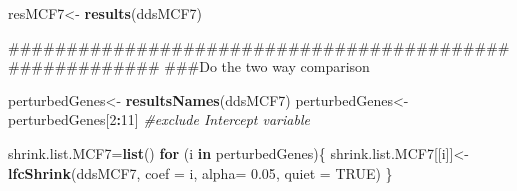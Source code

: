 \documentclass[]{article}
\newenvironment{Shaded}{\begin{snugshade}}{\end{snugshade}}
\newcommand{\KeywordTok}[1]{\textcolor[rgb]{0.13,0.29,0.53}{\textbf{#1}}}
\newcommand{\DataTypeTok}[1]{\textcolor[rgb]{0.13,0.29,0.53}{#1}}
\newcommand{\DecValTok}[1]{\textcolor[rgb]{0.00,0.00,0.81}{#1}}
\newcommand{\FloatTok}[1]{\textcolor[rgb]{0.00,0.00,0.81}{#1}}
\newcommand{\StringTok}[1]{\textcolor[rgb]{0.31,0.60,0.02}{#1}}
\newcommand{\CommentTok}[1]{\textcolor[rgb]{0.56,0.35,0.01}{\textit{#1}}}
\newcommand{\OtherTok}[1]{\textcolor[rgb]{0.56,0.35,0.01}{#1}}
\newcommand{\ControlFlowTok}[1]{\textcolor[rgb]{0.13,0.29,0.53}{\textbf{#1}}}
\newcommand{\OperatorTok}[1]{\textcolor[rgb]{0.81,0.36,0.00}{\textbf{#1}}}
\newcommand{\NormalTok}[1]{#1}
\begin{document}
\begin{Shaded}
\begin{Highlighting}[]
\NormalTok{resMCF7<-}\StringTok{ }\KeywordTok{results}\NormalTok{(ddsMCF7)}

\NormalTok{########################################################}
\NormalTok{###Do the two way comparison}

\NormalTok{perturbedGenes<-}\StringTok{ }\KeywordTok{resultsNames}\NormalTok{(ddsMCF7)}
\NormalTok{perturbedGenes<-}\StringTok{ }\NormalTok{perturbedGenes[}\DecValTok{2}\OperatorTok{:}\DecValTok{11}\NormalTok{] }\CommentTok{#exclude Intercept variable}

\NormalTok{shrink.list.MCF7=}\KeywordTok{list}\NormalTok{()}
\ControlFlowTok{for}\NormalTok{ (i }\ControlFlowTok{in}\NormalTok{ perturbedGenes)\{}
\NormalTok{    shrink.list.MCF7[[i]]<-}\StringTok{ }\KeywordTok{lfcShrink}\NormalTok{(ddsMCF7, }
                                 \DataTypeTok{coef =}\NormalTok{ i,}
                                 \DataTypeTok{alpha=} \FloatTok{0.05}\NormalTok{,}
                                 \DataTypeTok{quiet =} \OtherTok{TRUE}\NormalTok{)}
\NormalTok{\}}
\end{Highlighting}
\end{Shaded}

\begin{Shaded}
\end{Shaded}
\end{document}
